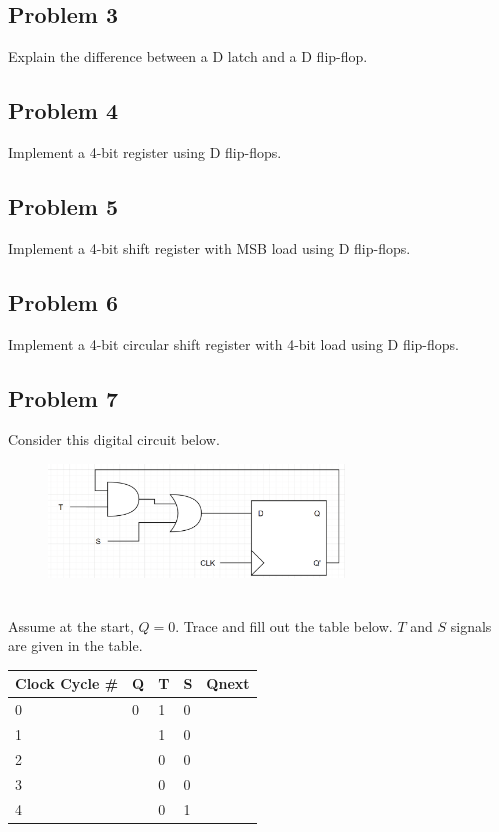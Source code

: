\documentclass{article}
\begin{document}
\subsection*{Problem 3}
Explain the difference between a D latch and a D flip-flop.


\subsection*{Problem 4}
Implement a 4-bit register using D flip-flops.


\subsection*{Problem 5}
Implement a 4-bit shift register with MSB load using D flip-flops.


\subsection*{Problem 6}
Implement a 4-bit circular shift register with 4-bit load using D flip-flops.

\newpage
\subsection*{Problem 7}
Consider this digital circuit below. \\
\begin{figure}[!h]
    \centering
    \includegraphics[width=0.7\textwidth]{figures/latch7.png}
\end{figure} \\
Assume at the start, $Q = 0$. Trace and fill out the table below. $T$ and $S$ signals are given in the table.
\begin{table}[!h]
\centering
\begin{tabular}{|l|l|l|l|l|}
\hline
\textbf{Clock Cycle \#} & \textbf{Q} & \textbf{T} & \textbf{S} & \textbf{Qnext} \\ \hline
0                       & 0          & 1          & 0          &                \\ \hline
1                       &            & 1          & 0          &                \\ \hline
2                       &            & 0          & 0          &                \\ \hline
3                       &            & 0          & 0          &                \\ \hline
4                       &            & 0          & 1          &                \\ \hline
\end{tabular}
\end{table}
\end{document}
